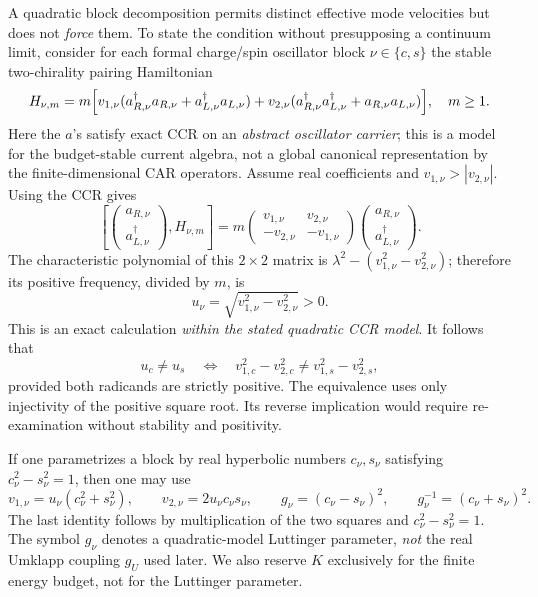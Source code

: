 A quadratic block decomposition permits distinct effective mode
velocities but does not \emph{force} them.  To state the condition
without presupposing a continuum limit, consider for each formal
charge/spin oscillator block $\nu\in\{c,s\}$ the stable two-chirality
pairing Hamiltonian
\begin{equation}
 H_{\nu,m}
 =m\Bigl[v_{1,\nu}
   (a_{R,\nu}^{\dagger}a_{R,\nu}
    +a_{L,\nu}^{\dagger}a_{L,\nu})
  +v_{2,\nu}(a_{R,\nu}^{\dagger}a_{L,\nu}^{\dagger}
                         +a_{R,\nu}a_{L,\nu})\Bigr],
 \quad m\geq1.
 \label{eq:ch21-pairing-hamiltonian}
\end{equation}
Here the $a$'s satisfy exact CCR on an \emph{abstract oscillator
carrier}; this is a model for the budget-stable current algebra, not
a global canonical representation by the finite-dimensional CAR
operators.  Assume real coefficients and
$v_{1,\nu}>|v_{2,\nu}|$.  Using the CCR gives
\begin{equation}
 \left[\begin{pmatrix}a_{R,\nu}\\a_{L,\nu}^{\dagger}\end{pmatrix},
                  H_{\nu,m}\right]
 =m\begin{pmatrix}
  v_{1,\nu}&v_{2,\nu}\\-v_{2,\nu}&-v_{1,\nu}
 \end{pmatrix}
 \begin{pmatrix}a_{R,\nu}\\a_{L,\nu}^{\dagger}\end{pmatrix}.
 \label{eq:ch21-bogoliubov-dynamic}
\end{equation}
The characteristic polynomial of this $2\times2$ matrix is
$\lambda^2-(v_{1,\nu}^2-v_{2,\nu}^2)$; therefore its positive
frequency, divided by $m$, is
\begin{equation}
 u_\nu=\sqrt{v_{1,\nu}^2-v_{2,\nu}^2}>0.
 \label{eq:ch21-block-speed}
\end{equation}
This is an exact calculation \emph{within the stated quadratic CCR
model}.  It follows that
\begin{equation}
 u_c\ne u_s
 \quad\Longleftrightarrow\quad
 v_{1,c}^2-v_{2,c}^2\ne v_{1,s}^2-v_{2,s}^2,
 \label{eq:ch21-speed-nondegeneracy}
\end{equation}
provided both radicands are strictly positive.  The equivalence
uses only injectivity of the positive square root.  Its reverse
implication would require re-examination without stability and
positivity.

If one parametrizes a block by real hyperbolic numbers
$c_\nu,s_\nu$ satisfying $c_\nu^2-s_\nu^2=1$, then one may use
\begin{equation}
 v_{1,\nu}=u_\nu(c_\nu^2+s_\nu^2),\qquad
 v_{2,\nu}=2u_\nu c_\nu s_\nu,\qquad
 g_\nu=(c_\nu-s_\nu)^2,\qquad
 g_\nu^{-1}=(c_\nu+s_\nu)^2.
 \label{eq:ch21-hyperbolic-parameters}
\end{equation}
The last identity follows by multiplication of the two squares and
$c_\nu^2-s_\nu^2=1$.  The symbol $g_\nu$ denotes a quadratic-model
Luttinger parameter, \emph{not} the real Umklapp coupling $g_U$
used later.  We also reserve $K$ exclusively for the finite energy
budget, not for the Luttinger parameter.

